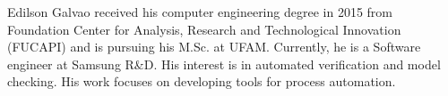 \documentclass[10pt,journal,compsoc]{IEEEtran}
\begin{document}

{}
%
%
%
% 
\begin{IEEEbiography}
    {Edilson Galvao} received his computer engineering degree in 2015 from Foundation Center for Analysis, Research and Technological Innovation (FUCAPI) and is pursuing his M.Sc. at UFAM. Currently, he is a Software engineer at Samsung R\&D. His interest is in automated verification and model checking. His work focuses on developing tools for process automation.
\end{IEEEbiography}
\end{document}
